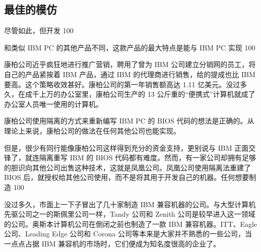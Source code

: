 \documentclass[12pt,UTF8]{ctexbook}
\begin{document}
\subsection{最佳的模仿}


尽管如此，但开发 100%

和类似 IBM PC 的其他产品不同，这款产品的最大特点是能与 IBM PC 实现 100%

康柏公司近乎疯狂地进行推广营销，聘用了曾为 IBM 公司建立分销网的员工，将自己的产品紧挨着 IBM 产品，通过 IBM 的代理商进行销售，给的提成也比 IBM 要高。这个策略收效甚好。康柏公司的第一年销售额高达 1.11 亿美元。没过多久，在成千上万的办公室里，康柏公司生产的 13 公斤重的“便携式”计算机就成了办公室人员唯一使用的计算机。

康柏公司使用隔离的方式来重新编写 IBM PC 的 BIOS 代码的想法是正确的。从理论上来说，康柏公司的做法在任何其他公司也能实现。

但是，很少有同行能像康柏公司这样得到充分的资金支持，更别说与 IBM 正面交锋了，就连隔离重写 IBM 的 BIOS 代码都有难度。然而，有一家公司却拥有足够的胆识向其他公司出售这种技术，这就是凤凰公司。凤凰公司使用隔离法重建了 BIOS 后，就授权给其他公司使用，而不是将其用于开发自己的机器。任何想要制造 100%

没过多久，市面上一下子冒出了几十家制造 IBM 兼容机器的公司。与大型计算机先驱公司之一的斯佩里公司一样，Tandy 公司和 Zenith 公司是较早进入这一领域的公司。奥斯本计算机公司在倒闭之前也制造了一款 IBM 兼容机器。ITT、Eagle 公司、Leading Edge 公司和 Corona 公司等本来是大家并不熟悉的一些公司，当一点点占据 IBM 兼容机的市场时，它们便成为知名度很高的企业了。
\end{document}
